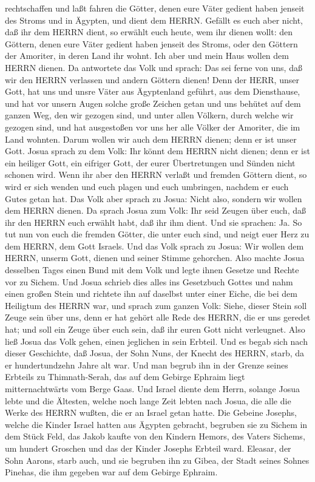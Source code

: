 rechtschaffen und laßt fahren die Götter, denen eure Väter gedient haben
jenseit des Stroms und in Ägypten, und dient dem HERRN. 
Gefällt es euch aber nicht, daß ihr dem HERRN dient, so erwählt euch
heute, wem ihr dienen wollt: den Göttern, denen eure Väter gedient haben
jenseit des Stroms, oder den Göttern der Amoriter, in deren Land ihr
wohnt. Ich aber und mein Haus wollen dem HERRN dienen.  Da
antwortete das Volk und sprach: Das sei ferne von uns, daß wir den HERRN
verlassen und andern Göttern dienen!  Denn der HERR, unser
Gott, hat uns und unsre Väter aus Ägyptenland geführt, aus dem
Diensthause, und hat vor unsern Augen solche große Zeichen getan und uns
behütet auf dem ganzen Weg, den wir gezogen sind, und unter allen
Völkern, durch welche wir gezogen sind,  und hat
ausgestoßen vor uns her alle Völker der Amoriter, die im Land wohnten.
Darum wollen wir auch dem HERRN dienen; denn er ist unser Gott.
 Josua sprach zu dem Volk: Ihr könnt dem HERRN nicht
dienen; denn er ist ein heiliger Gott, ein eifriger Gott, der eurer
Übertretungen und Sünden nicht schonen wird.  Wenn ihr aber
den HERRN verlaßt und fremden Göttern dient, so wird er sich wenden und
euch plagen und euch umbringen, nachdem er euch Gutes getan hat.
 Das Volk aber sprach zu Josua: Nicht also, sondern wir
wollen dem HERRN dienen.  Da sprach Josua zum Volk: Ihr
seid Zeugen über euch, daß ihr den HERRN euch erwählt habt, daß ihr ihm
dient. Und sie sprachen: Ja.  So tut nun von euch die
fremden Götter, die unter euch sind, und neigt euer Herz zu dem HERRN,
dem Gott Israels.  Und das Volk sprach zu Josua: Wir wollen
dem HERRN, unserm Gott, dienen und seiner Stimme gehorchen.
 Also machte Josua desselben Tages einen Bund mit dem Volk
und legte ihnen Gesetze und Rechte vor zu Sichem.  Und
Josua schrieb dies alles ins Gesetzbuch Gottes und nahm einen großen
Stein und richtete ihn auf daselbst unter einer Eiche, die bei dem
Heiligtum des HERRN war,  und sprach zum ganzen Volk:
Siehe, dieser Stein soll Zeuge sein über uns, denn er hat gehört alle
Rede des HERRN, die er uns geredet hat; und soll ein Zeuge über euch
sein, daß ihr euren Gott nicht verleugnet.  Also ließ Josua
das Volk gehen, einen jeglichen in sein Erbteil.  Und es
begab sich nach dieser Geschichte, daß Josua, der Sohn Nuns, der Knecht
des HERRN, starb, da er hundertundzehn Jahre alt war.  Und
man begrub ihn in der Grenze seines Erbteils zu Thimnath-Serah, das auf
dem Gebirge Ephraim liegt mitternachtwärts vom Berge Gaas. 
Und Israel diente dem Herrn, solange Josua lebte und die Ältesten,
welche noch lange Zeit lebten nach Josua, die alle die Werke des HERRN
wußten, die er an Israel getan hatte.  Die Gebeine Josephs,
welche die Kinder Israel hatten aus Ägypten gebracht, begruben sie zu
Sichem in dem Stück Feld, das Jakob kaufte von den Kindern Hemors, des
Vaters Sichems, um hundert Groschen und das der Kinder Josephs Erbteil
ward.  Eleasar, der Sohn Aarons, starb auch, und sie
begruben ihn zu Gibea, der Stadt seines Sohnes Pinehas, die ihm gegeben
war auf dem Gebirge Ephraim.
